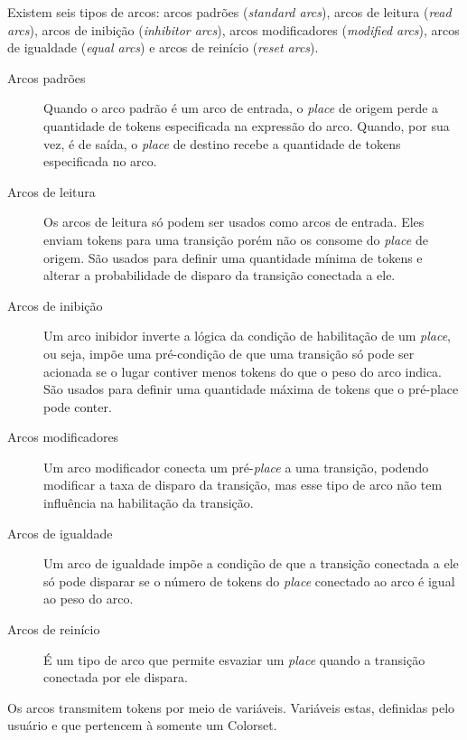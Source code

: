 \documentclass[a4paper,10pt]{article}
\begin{document}
			Existem seis tipos de arcos: arcos padrões (\textit{standard arcs}), arcos de leitura (\textit{read arcs}), 
			arcos de inibição (\textit{inhibitor arcs}), arcos modificadores (\textit{modified arcs}), 
			arcos de igualdade (\textit{equal arcs}) e arcos de reinício (\textit{reset arcs}).
			\begin{description}
				\item [Arcos padrões] Quando o arco padrão é um arco de entrada, o \textit{place} de origem perde a quantidade de 
				tokens especificada na expressão do arco. Quando, por sua vez, é de saída, o \textit{place} de destino recebe a 
				quantidade de tokens especificada no arco. 
				\item [Arcos de leitura] Os arcos de leitura só podem ser usados como arcos de entrada. 				
				Eles enviam tokens para uma transição porém não os consome do \textit{place} de origem. 
				São usados para definir uma quantidade mínima de tokens e alterar a probabilidade de disparo 
				da transição conectada a ele.
				\item [Arcos de inibição] Um arco inibidor inverte a lógica da condição de habilitação de um \textit{place}, 
				ou seja, impõe uma pré-condição de que uma transição só pode ser acionada se o lugar contiver 
				menos tokens do que o peso do arco indica. São usados para definir uma quantidade máxima de tokens que o pré-place pode conter.				
				\item [Arcos modificadores] Um arco modificador conecta um pré-\textit{place} a uma transição, podendo modificar 
				a taxa de disparo da transição, mas esse tipo de arco não tem influência na habilitação da transição. 
				\item [Arcos de igualdade] Um arco de igualdade impõe a condição de que a transição conectada a ele 
				só pode disparar se o número de tokens do \textit{place} conectado ao arco é igual ao peso do arco. 
				\item [Arcos de reinício] É um tipo de arco que permite esvaziar um \textit{place} quando a transição 
				conectada por ele dispara. 
			\end{description}
			
			
			Os arcos transmitem tokens por meio de variáveis. Variáveis estas, definidas pelo usuário e 
			que pertencem à somente um Colorset.			
				
			
				
		
\end{document}
